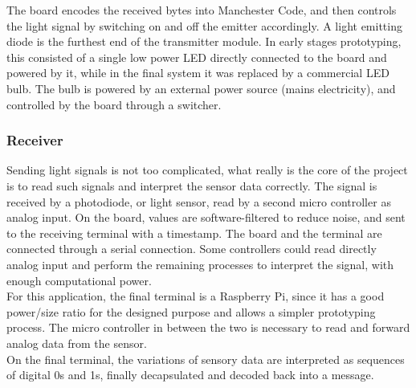 The board encodes the received bytes into Manchester Code, and then controls the light signal by switching on and off the emitter accordingly.
A light emitting diode is the furthest end of the transmitter module. In early stages prototyping, this consisted of a single low power LED directly connected to the board and powered by it, while in the final system it was replaced by a commercial LED bulb. The bulb is powered by an external power source (mains electricity), and controlled by the board through a switcher. 

\subsubsection{Receiver}
Sending light signals is not too complicated, what really is the core of the project is to read such signals and interpret the sensor data correctly.
The signal is received by a photodiode,  or light sensor, read by a second micro controller as analog input.
On the board, values are software-filtered to reduce noise, and sent to the receiving terminal with a timestamp.
The board and the terminal are connected through a serial connection.
Some controllers could read directly analog input and perform the remaining processes to interpret the signal, with enough computational power.\\ For this application, the final terminal is a Raspberry Pi, since it has a good power/size ratio for the designed purpose and allows a simpler prototyping process. The micro controller in between the two is necessary to read and forward analog data from the sensor.\\
On the final terminal, the variations of sensory data are interpreted as sequences of digital 0s and 1s, finally decapsulated and decoded back into a message.

